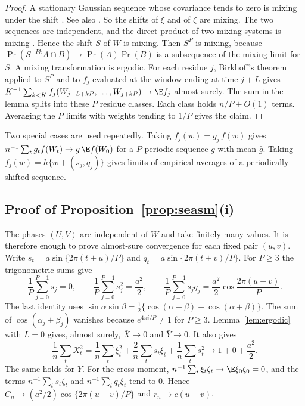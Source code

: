 \begin{proof}
A stationary Gaussian sequence whose covariance tends to zero is mixing under the shift \citep{maruyama1949harmonic}\vc. See also \citet[Chapter~14]{cornfeld1982ergodic}\vc. So the shifts of $\xi$ and of $\zeta$ are mixing. The two sequences are independent, and the direct product of two mixing systems is mixing \citep[Section~1.7]{walters1982introduction}\vc. Hence the shift $S$ of $W$ is mixing. Then $S^P$ is mixing, because $\Pr(S^{-Pk}A\cap B)\to\Pr(A)\Pr(B)$ is a subsequence of the mixing limit for $S$. A mixing transformation is ergodic. For each residue $j$, Birkhoff's theorem applied to $S^P$ and to $f_j$ evaluated at the window ending at time $j+L$ gives $K^{-1}\sum_{k<K}f_j(W_{j+L+kP},\ldots,W_{j+kP})\to\E f_j$ almost surely. The sum in the lemma splits into these $P$ residue classes. Each class holds $n/P+O(1)$ terms. Averaging the $P$ limits with weights tending to $1/P$ gives the claim.
\end{proof}

Two special cases are used repeatedly. Taking $f_j(w)=g_j\,f(w)$ gives $n^{-1}\sum_t g_t f(W_t)\to\bar g\,\E f(W_0)$ for a $P$-periodic sequence $g$ with mean $\bar g$. Taking $f_j(w)=h\{w+(s_j,q_j)\}$ gives limits of empirical averages of a periodically shifted sequence.

\subsection{Proof of Proposition~\ref{prop:seasm}(i)}
The phases $(U,V)$ are independent of $W$ and take finitely many values. It is therefore enough to prove almost-sure convergence for each fixed pair $(u,v)$. Write $s_t=a\sin\{2\pi(t+u)/P\}$ and $q_t=a\sin\{2\pi(t+v)/P\}$. For $P\ge3$ the trigonometric sums give
\[
\frac1P\sum_{j=0}^{P-1}s_j=0,\qquad\frac1P\sum_{j=0}^{P-1}s_j^2=\frac{a^2}2,\qquad\frac1P\sum_{j=0}^{P-1}s_jq_j=\frac{a^2}2\cos\frac{2\pi(u-v)}P.
\]
The last identity uses $\sin\alpha\sin\beta=\tfrac12\{\cos(\alpha-\beta)-\cos(\alpha+\beta)\}$. The sum of $\cos(\alpha_j+\beta_j)$ vanishes because $e^{4\pi i/P}\ne1$ for $P\ge3$. Lemma~\ref{lem:ergodic} with $L=0$ gives, almost surely, $\bar X\to0$ and $\bar Y\to0$. It also gives
\[
\frac1n\sum_tX_t^2=\frac1n\sum_t\xi_t^2+\frac2n\sum_ts_t\xi_t+\frac1n\sum_ts_t^2\to1+0+\frac{a^2}2.
\]
The same holds for $Y$. For the cross moment, $n^{-1}\sum_t\xi_t\zeta_t\to\E\xi_0\zeta_0=0$, and the terms $n^{-1}\sum_ts_t\zeta_t$ and $n^{-1}\sum_tq_t\xi_t$ tend to $0$. Hence $\hat C_n\to(a^2/2)\cos\{2\pi(u-v)/P\}$ and $r_n\to c(u-v)$.

